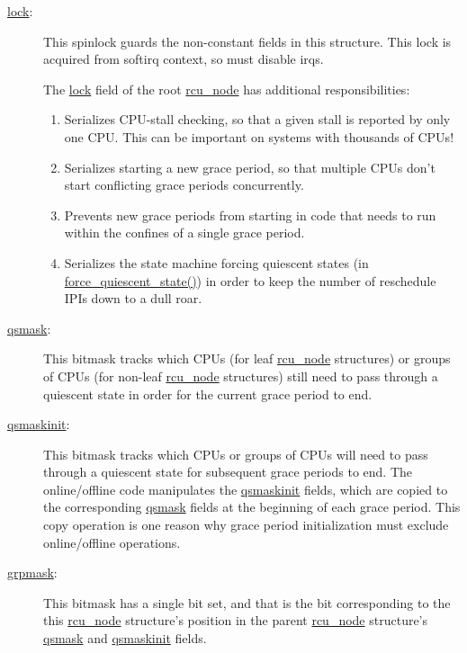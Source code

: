 \begin{description}
\item[\url{lock}:]
	This spinlock guards the non-constant fields in this structure.
	This lock is acquired from softirq context, so must disable
	irqs.

 \QuickQuizEnd

	The \url{lock} field of the root \url{rcu_node} has additional
	responsibilities:
	\begin{enumerate}
	\item	Serializes CPU-stall checking, so that a given stall
		is reported by only one CPU.
		This can be important on systems with thousands of
		CPUs!
	\item	Serializes starting a new grace period, so that
		multiple CPUs don't start conflicting grace periods
		concurrently.
	\item	Prevents new grace periods from starting in code that
		needs to run within the confines of a single grace period.
	\item	Serializes the state machine forcing quiescent states
		(in \url{force_quiescent_state()}) in order to
		keep the number of reschedule IPIs down to a dull
		roar.
	\end{enumerate}
\item[\url{qsmask}:]
	This bitmask tracks which CPUs (for leaf \url{rcu_node} structures)
	or groups of CPUs (for non-leaf \url{rcu_node} structures)
	still need to pass through a quiescent state in order for the
	current grace period to end.
\item[\url{qsmaskinit}:]
	This bitmask tracks which CPUs or groups of CPUs will need to
	pass through a quiescent state for subsequent grace periods
	to end.
	The online/offline code manipulates the \url{qsmaskinit} fields,
	which are copied to the corresponding \url{qsmask} fields at
	the beginning of each grace period.
	This copy operation is one reason why grace period initialization
	must exclude online/offline operations.
\item[\url{grpmask}:]
	This bitmask has a single bit set, and that is the bit corresponding
	to the this \url{rcu_node} structure's position in the parent
	\url{rcu_node} structure's \url{qsmask} and \url{qsmaskinit}
	fields.


\end{description}
